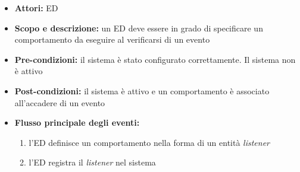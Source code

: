 \begin{itemize}
	\item \textbf{Attori:} ED
	\item \textbf{Scopo e descrizione:} un ED deve essere in grado di specificare un comportamento da eseguire al verificarsi di un evento
	\item \textbf{Pre-condizioni:} il sistema è stato configurato correttamente. Il sistema non è attivo
	\item \textbf{Post-condizioni:} il sistema è attivo e un comportamento è associato all'accadere di un evento
	\item \textbf{Flusso principale degli eventi:}
		\begin{enumerate}
			\item l'ED definisce un comportamento nella forma di un entità \emph{listener}
			\item l'ED registra il \emph{listener} nel sistema
		\end{enumerate}
	
\end{itemize}

